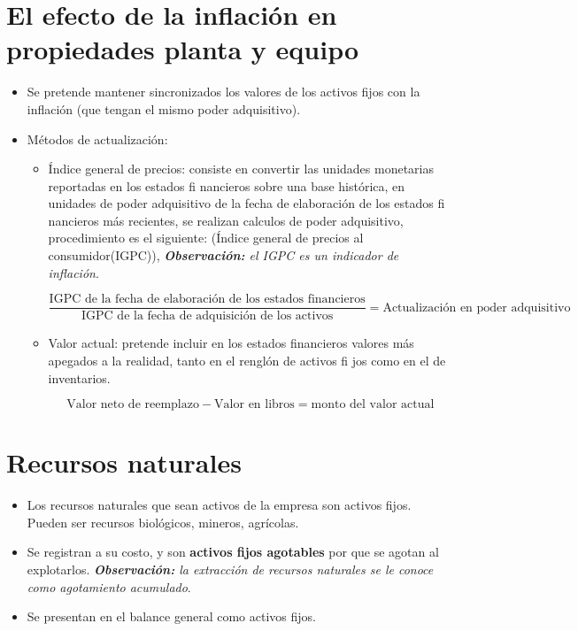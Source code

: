 \documentclass{article}
\begin{document}
\section{El efecto de la inflación en propiedades planta y equipo}
\begin{itemize}
    \item Se pretende mantener sincronizados los valores de los activos fijos con la inflación (que tengan el mismo poder adquisitivo).
    \item Métodos de actualización:
        \begin{itemize}
            \item Índice general de precios: consiste en convertir las unidades monetarias reportadas en los estados fi nancieros sobre una base histórica, en unidades de poder adquisitivo de la fecha de elaboración de los estados fi nancieros más recientes, se realizan calculos de poder adquisitivo, procedimiento es el siguiente: (Índice general de precios al consumidor(IGPC)), \emph{\textbf{Observación: }el IGPC es un indicador de inflación}.
                \begin{center}
                   \[
                     \frac{\text{IGPC de la fecha de elaboración de los estados financieros}}{\text{IGPC de la fecha de adquisición de los activos}} = \text{Actualización en poder adquisitivo}
                   \]
                \end{center}
            \item Valor actual: pretende incluir en los estados financieros valores más apegados a la realidad, tanto en el renglón de activos fi jos como en el de inventarios. 
                \begin{center}
                   \[
                     \text{Valor neto de reemplazo} - \text{Valor en libros} = \text{monto del valor actual}
                   \]
                \end{center}
        \end{itemize}
\end{itemize}

\section{Recursos naturales}
\begin{itemize}
    \item Los recursos naturales que sean activos de la empresa son activos fijos. Pueden ser recursos biológicos, mineros, agrícolas.
    \item Se registran a su costo, y son \textbf{activos fijos agotables} por que se agotan al explotarlos. \emph{\textbf{Observación: }la extracción de recursos naturales se le conoce como agotamiento acumulado}.
    \item Se presentan en el balance general como activos fijos.
\end{itemize}
\end{document}
